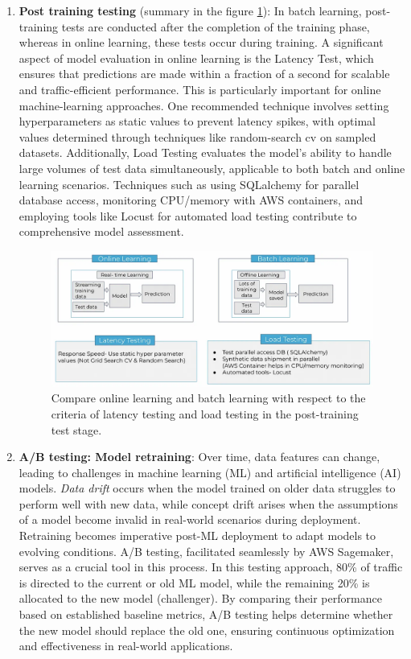 \documentclass[12pt,a4paper]{article}
\begin{document}
\begin{enumerate}
	\item \textbf{Post training testing} (summary in the figure \ref{fig:post-test}): In batch learning, post-training tests are conducted after the completion of the training phase, whereas in online learning, these tests occur during training. A significant aspect of model evaluation in online learning is the Latency Test, which ensures that predictions are made within a fraction of a second for scalable and traffic-efficient performance. This is particularly important for online machine-learning approaches. One recommended technique involves setting hyperparameters as static values to prevent latency spikes, with optimal values determined through techniques like random-search cv on sampled datasets. Additionally, Load Testing evaluates the model's ability to handle large volumes of test data simultaneously, applicable to both batch and online learning scenarios. Techniques such as using SQLalchemy for parallel database access, monitoring CPU/memory with AWS containers, and employing tools like Locust for automated load testing contribute to comprehensive model assessment.
	\begin{figure}
		\centering
		\includegraphics[width=0.8\linewidth]{assets/post-test}
		\caption{Compare online learning and batch learning with respect to the criteria of latency testing and load testing in the post-training test stage. \cite{test}}
		\label{fig:post-test}
	\end{figure}
	
	\item \textbf{A/B testing: Model retraining}: Over time, data features can change, leading to challenges in machine learning (ML) and artificial intelligence (AI) models. \textit{Data drift} occurs when the model trained on older data struggles to perform well with new data, while concept drift arises when the assumptions of a model become invalid in real-world scenarios during deployment. Retraining becomes imperative post-ML deployment to adapt models to evolving conditions. A/B testing, facilitated seamlessly by AWS Sagemaker, serves as a crucial tool in this process. In this testing approach, 80\% of traffic is directed to the current or old ML model, while the remaining 20\% is allocated to the new model (challenger). By comparing their performance based on established baseline metrics, A/B testing helps determine whether the new model should replace the old one, ensuring continuous optimization and effectiveness in real-world applications.
	

\end{enumerate}
\end{document}
